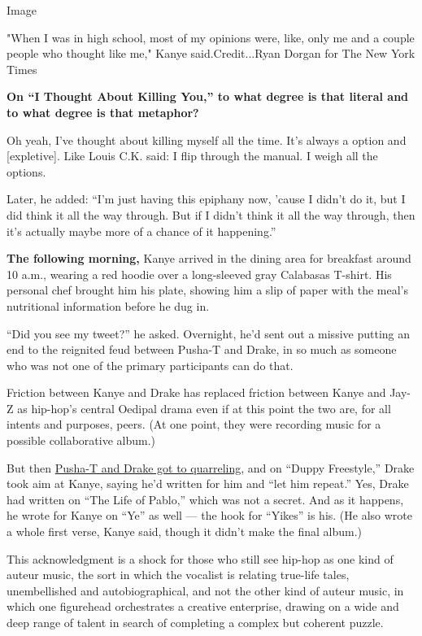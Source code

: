 Image

"When I was in high school, most of my opinions were, like, only me and
a couple people who thought like me," Kanye said.Credit...Ryan Dorgan
for The New York Times

\textbf{On ``I Thought About Killing You,'' to what degree is that
literal and to what degree is that metaphor?}

Oh yeah, I've thought about killing myself all the time. It's always a
option and {[}expletive{]}. Like Louis C.K. said: I flip through the
manual. I weigh all the options.

Later, he added: ``I'm just having this epiphany now, 'cause I didn't do
it, but I did think it all the way through. But if I didn't think it all
the way through, then it's actually maybe more of a chance of it
happening.''

\textbf{The following morning,} Kanye arrived in the dining area for
breakfast around 10 a.m., wearing a red hoodie over a long-sleeved gray
Calabasas T-shirt. His personal chef brought him his plate, showing him
a slip of paper with the meal's nutritional information before he dug
in.

``Did you see my tweet?'' he asked. Overnight, he'd sent out a missive
putting an end to the reignited feud between Pusha-T and Drake, in so
much as someone who was not one of the primary participants can do that.

Friction between Kanye and Drake has replaced friction between Kanye and
Jay-Z as hip-hop's central Oedipal drama even if at this point the two
are, for all intents and purposes, peers. (At one point, they were
recording music for a possible collaborative album.)

But then
\href{https://www.nytimes3xbfgragh.onion/2018/05/31/arts/music/popcast-drake-pusha-t.html}{Pusha-T
and Drake got to quarreling}, and on ``Duppy Freestyle,'' Drake took aim
at Kanye, saying he'd written for him and ``let him repeat.'' Yes, Drake
had written on ``The Life of Pablo,'' which was not a secret. And as it
happens, he wrote for Kanye on ``Ye'' as well --- the hook for ``Yikes''
is his. (He also wrote a whole first verse, Kanye said, though it didn't
make the final album.)

This acknowledgment is a shock for those who still see hip-hop as one
kind of auteur music, the sort in which the vocalist is relating
true-life tales, unembellished and autobiographical, and not the other
kind of auteur music, in which one figurehead orchestrates a creative
enterprise, drawing on a wide and deep range of talent in search of
completing a complex but coherent puzzle.

